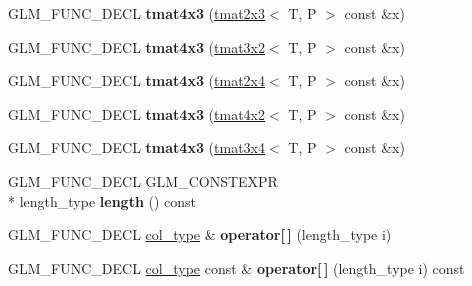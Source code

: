 \begin{DoxyCompactItemize}
\item 
\hypertarget{structglm_1_1tmat4x3_ac73e3e89eac9d9d6b6f8dbb49f55a0e2}{G\-L\-M\-\_\-\-F\-U\-N\-C\-\_\-\-D\-E\-C\-L {\bfseries tmat4x3} (\hyperlink{structglm_1_1tmat2x3}{tmat2x3}$<$ T, P $>$ const \&x)}\label{structglm_1_1tmat4x3_ac73e3e89eac9d9d6b6f8dbb49f55a0e2}

\item 
\hypertarget{structglm_1_1tmat4x3_a125210f891f2b11559d36ea49cbb66ba}{G\-L\-M\-\_\-\-F\-U\-N\-C\-\_\-\-D\-E\-C\-L {\bfseries tmat4x3} (\hyperlink{structglm_1_1tmat3x2}{tmat3x2}$<$ T, P $>$ const \&x)}\label{structglm_1_1tmat4x3_a125210f891f2b11559d36ea49cbb66ba}

\item 
\hypertarget{structglm_1_1tmat4x3_a7c76da17513ed772c8b7ebf778fd881f}{G\-L\-M\-\_\-\-F\-U\-N\-C\-\_\-\-D\-E\-C\-L {\bfseries tmat4x3} (\hyperlink{structglm_1_1tmat2x4}{tmat2x4}$<$ T, P $>$ const \&x)}\label{structglm_1_1tmat4x3_a7c76da17513ed772c8b7ebf778fd881f}

\item 
\hypertarget{structglm_1_1tmat4x3_adfbc5c5490e4bd2606d1c20fd76cd3b2}{G\-L\-M\-\_\-\-F\-U\-N\-C\-\_\-\-D\-E\-C\-L {\bfseries tmat4x3} (\hyperlink{structglm_1_1tmat4x2}{tmat4x2}$<$ T, P $>$ const \&x)}\label{structglm_1_1tmat4x3_adfbc5c5490e4bd2606d1c20fd76cd3b2}

\item 
\hypertarget{structglm_1_1tmat4x3_a61edf2edf20cb9f6b6a977aa041d5f19}{G\-L\-M\-\_\-\-F\-U\-N\-C\-\_\-\-D\-E\-C\-L {\bfseries tmat4x3} (\hyperlink{structglm_1_1tmat3x4}{tmat3x4}$<$ T, P $>$ const \&x)}\label{structglm_1_1tmat4x3_a61edf2edf20cb9f6b6a977aa041d5f19}

\item 
\hypertarget{structglm_1_1tmat4x3_ab6791f7fc6123335b715238bc6540133}{G\-L\-M\-\_\-\-F\-U\-N\-C\-\_\-\-D\-E\-C\-L G\-L\-M\-\_\-\-C\-O\-N\-S\-T\-E\-X\-P\-R \\*
length\-\_\-type {\bfseries length} () const }\label{structglm_1_1tmat4x3_ab6791f7fc6123335b715238bc6540133}

\item 
\hypertarget{structglm_1_1tmat4x3_a079c5c89aa4fb8235e738b1b4db13fc3}{G\-L\-M\-\_\-\-F\-U\-N\-C\-\_\-\-D\-E\-C\-L \hyperlink{structglm_1_1tvec3}{col\-\_\-type} \& {\bfseries operator\mbox{[}$\,$\mbox{]}} (length\-\_\-type i)}\label{structglm_1_1tmat4x3_a079c5c89aa4fb8235e738b1b4db13fc3}

\item 
\hypertarget{structglm_1_1tmat4x3_a6835adac337993db51d420e9f0da57d3}{G\-L\-M\-\_\-\-F\-U\-N\-C\-\_\-\-D\-E\-C\-L \hyperlink{structglm_1_1tvec3}{col\-\_\-type} const \& {\bfseries operator\mbox{[}$\,$\mbox{]}} (length\-\_\-type i) const }\label{structglm_1_1tmat4x3_a6835adac337993db51d420e9f0da57d3}


\end{DoxyCompactItemize}
